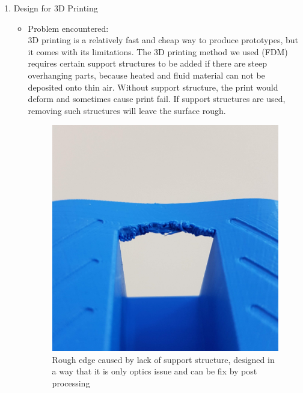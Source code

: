 \begin{enumerate}
\begin{itemize}
  \end{itemize}
  \item Design for 3D Printing
  \begin{itemize}
      \item Problem encountered:\\
      3D printing is a relatively fast and cheap way to produce prototypes, but it comes with its limitations. The 3D printing method we used (FDM) requires certain support structures to be added if there are steep overhanging parts, because heated and fluid material can not be deposited onto thin air. Without support structure, the print would deform and sometimes cause print fail. If support structures are used, removing such structures will leave the surface rough.

\begin{figure}[htb]
    \centering
    \begin{minipage}{.45\textwidth}
          \centering
            \includegraphics[width=.9\linewidth]{figures/Casing/RoughEdge.jpg}
              \caption{Rough edge caused by lack of support structure, designed in a way that it is only optics issue and can be fix by post processing}
    \end{minipage}
    \begin{minipage}{.45\textwidth}
          \centering

\end{minipage}
\end{figure}
\end{itemize}
\end{enumerate}
